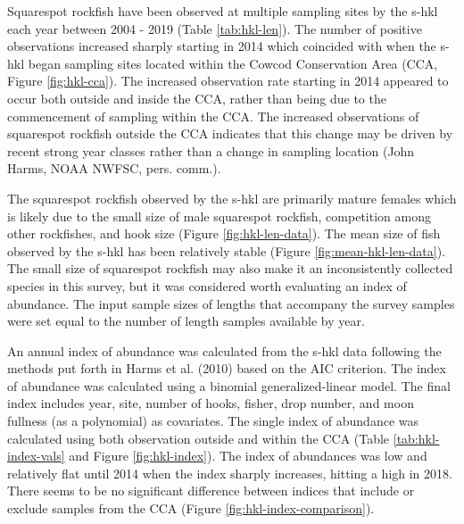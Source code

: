 \documentclass[11pt,
  english,
  a4paper,
]{article}
\begin{document}
\leavevmode\tagmcend\tagstructend\par


Squarespot rockfish have been observed at multiple sampling sites by the \Gls{s-hkl} each year between 2004 - 2019 (Table \ref{tab:hkl-len}). The number of positive observations increased sharply starting in 2014 which coincided with when the \gls{s-hkl} began sampling sites located within the Cowcod Conservation Area (CCA, Figure \ref{fig:hkl-cca}). The increased observation rate starting in 2014 appeared to occur both outside and inside the CCA, rather than being due to the commencement of sampling within the CCA. The increased observations of squarespot rockfish outside the CCA indicates that this change may be driven by recent strong year classes rather than a change in sampling location (John Harms, NOAA NWFSC, pers. comm.).

\leavevmode\tagmcend\tagstructend\par


The squarespot rockfish observed by the \Gls{s-hkl} are primarily mature females which is likely due to the small size of male squarespot rockfish, competition among other rockfishes, and hook size (Figure \ref{fig:hkl-len-data}). The mean size of fish observed by the \Gls{s-hkl} has been relatively stable (Figure \ref{fig:mean-hkl-len-data}). The small size of squarespot rockfish may also make it an inconsistently collected species in this survey, but it was considered worth evaluating an index of abundance. The input sample sizes of lengths that accompany the survey samples were set equal to the number of length samples available by year.

\leavevmode\tagmcend\tagstructend\par


An annual index of abundance was calculated from the \Gls{s-hkl} data following the methods put forth in Harms et al. {(2010)\leavevmode\tagmcend\tagstructend} based on the AIC criterion. The index of abundance was calculated using a binomial generalized-linear model. The final index includes year, site, number of hooks, fisher, drop number, and moon fullness (as a polynomial) as covariates. The single index of abundance was calculated using both observation outside and within the CCA (Table \ref{tab:hkl-index-vals} and Figure \ref{fig:hkl-index}). The index of abundances was low and relatively flat until 2014 when the index sharply increases, hitting a high in 2018. There seems to be no significant difference between indices that include or exclude samples from the CCA (Figure \ref{fig:hkl-index-comparison}).
\end{document}
